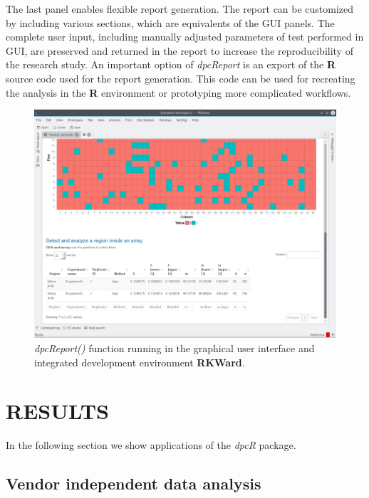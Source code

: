 \documentclass[a4,center,fleqn]{NAR}
\begin{document}
The last panel enables flexible report generation. The report can be customized 
by including various sections, which are equivalents of the GUI panels. The 
complete user input, including manually adjusted parameters of test performed in 
GUI, are preserved and returned in the report to increase the reproducibility of 
the research study. An important option of \textit{dpcReport} is an export of 
the \textbf{R} source code used for the report generation. This code can be used 
for recreating the analysis in the \textbf{R} environment or prototyping more 
complicated workflows.





\begin{figure}[t]
\begin{center}
\includegraphics[width=17cm]{GUI_RKWard_1.png}
\end{center}
\caption{\textit{dpcReport()} function running in the graphical user interface 
and integrated development environment \textbf{RKWard}.} 
\label{GUI_RKWard_1}
\end{figure}




\section{RESULTS}

In the following section we show applications of the \textit{dpcR} package.

\subsection{Vendor independent data analysis}
\end{document}
